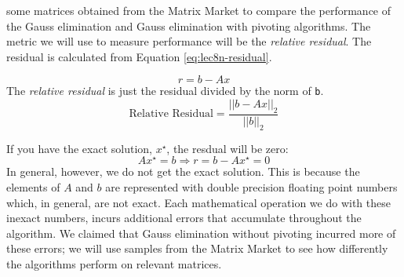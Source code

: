  some matrices obtained from the Matrix Market to compare the performance of the Gauss elimination and Gauss elimination with pivoting algorithms.  The metric we will use to measure performance will be the \emph{relative residual}.  The residual is calculated from Equation \ref{eq:lec8n-residual}.

\begin{equation}
r = b - Ax
\label{eq:lec8n-residual}
\end{equation}
The \emph{relative residual} is just the residual divided by the norm of \lstinline[style=myMatlab]{b}.
\begin{equation}
\text{Relative Residual} = \frac{||b - Ax||_{2}}{||b||_2}
\end{equation}

If you have the exact solution, $x^{\star}$, the resdual will be zero:
\begin{equation*}
Ax^{\star} = b \Rightarrow r = b - Ax^{\star} = 0
\end{equation*}
In general, however, we do not get the exact solution.  This is because the elements of $A$ and $b$ are represented with double precision floating point numbers which, in general, are not exact.  Each mathematical operation we do with these inexact numbers, incurs additional errors that accumulate throughout the algorithm.  We claimed that Gauss elimination without pivoting incurred more of these errors; we will use samples from the Matrix Market to see how differently the algorithms perform on relevant matrices.

